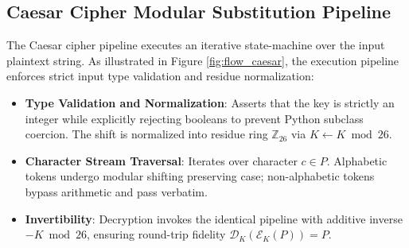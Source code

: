 \documentclass[12pt,a4paper]{report}
\begin{document}
\subsection{Caesar Cipher Modular Substitution Pipeline}
The Caesar cipher pipeline executes an iterative state-machine over the input plaintext string. As illustrated in Figure \ref{fig:flow_caesar}, the execution pipeline enforces strict input type validation and residue normalization:
\begin{itemize}[leftmargin=1.5em,topsep=1pt,itemsep=1pt,parsep=0pt]
    \item \textbf{Type Validation and Normalization}: Asserts that the key is strictly an integer while explicitly rejecting booleans to prevent Python subclass coercion. The shift is normalized into residue ring $\mathbb{Z}_{26}$ via $K \gets K \bmod 26$.
    \item \textbf{Character Stream Traversal}: Iterates over character $c \in P$. Alphabetic tokens undergo modular shifting preserving case; non-alphabetic tokens bypass arithmetic and pass verbatim.
    \item \textbf{Invertibility}: Decryption invokes the identical pipeline with additive inverse $-K \bmod 26$, ensuring round-trip fidelity $\mathcal{D}_K(\mathcal{E}_K(P)) = P$.
\end{itemize}
\end{document}
